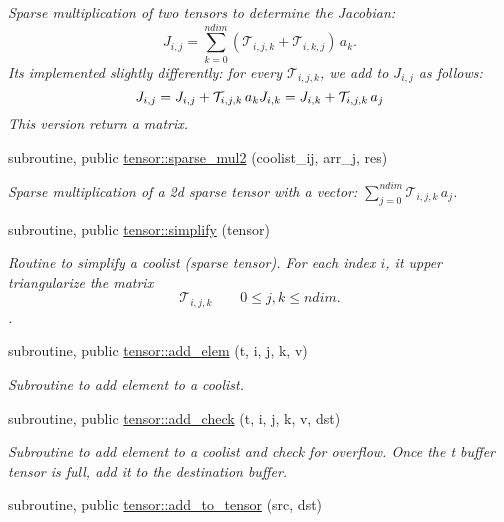 \begin{DoxyCompactItemize}
\begin{DoxyCompactList}\small\item\em Sparse multiplication of two tensors to determine the Jacobian\+: \[J_{i,j} = {\displaystyle \sum_{k=0}^{ndim}} \left( \mathcal{T}_{i,j,k} + \mathcal{T}_{i,k,j} \right) \, a_k.\] It\textquotesingle{}s implemented slightly differently\+: for every $\mathcal{T}_{i,j,k}$, we add to $J_{i,j}$ as follows\+: \[J_{i,j} = J_{i,j} + \mathcal{T}_{i,j,k} \, a_k \\ J_{i,k} = J_{i,k} + \mathcal{T}_{i,j,k} \, a_j\] This version return a matrix. \end{DoxyCompactList}\item 
subroutine, public \hyperlink{namespacetensor_a70230d57c615d9548905bc023f5fc01d}{tensor\+::sparse\+\_\+mul2} (coolist\+\_\+ij, arr\+\_\+j, res)
\begin{DoxyCompactList}\small\item\em Sparse multiplication of a 2d sparse tensor with a vector\+: ${\displaystyle \sum_{j=0}^{ndim}} \mathcal{T}_{i,j,k} \, a_j $. \end{DoxyCompactList}\item 
subroutine, public \hyperlink{namespacetensor_a364522b80ab0f4785c331eb74fa1ba04}{tensor\+::simplify} (tensor)
\begin{DoxyCompactList}\small\item\em Routine to simplify a coolist (sparse tensor). For each index $i$, it upper triangularize the matrix \[\mathcal{T}_{i,j,k} \qquad 0 \leq j,k \leq ndim.\]. \end{DoxyCompactList}\item 
subroutine, public \hyperlink{namespacetensor_a7f144457b3535357ab582fc3ff0da3a0}{tensor\+::add\+\_\+elem} (t, i, j, k, v)
\begin{DoxyCompactList}\small\item\em Subroutine to add element to a coolist. \end{DoxyCompactList}\item 
subroutine, public \hyperlink{namespacetensor_ac86b7b23b35e64127e04b31d7cfc7ae9}{tensor\+::add\+\_\+check} (t, i, j, k, v, dst)
\begin{DoxyCompactList}\small\item\em Subroutine to add element to a coolist and check for overflow. Once the t buffer tensor is full, add it to the destination buffer. \end{DoxyCompactList}\item 
subroutine, public \hyperlink{namespacetensor_aad7cd55f3a4cec4676cc7ca34b05f1a8}{tensor\+::add\+\_\+to\+\_\+tensor} (src, dst)

\end{DoxyCompactItemize}
